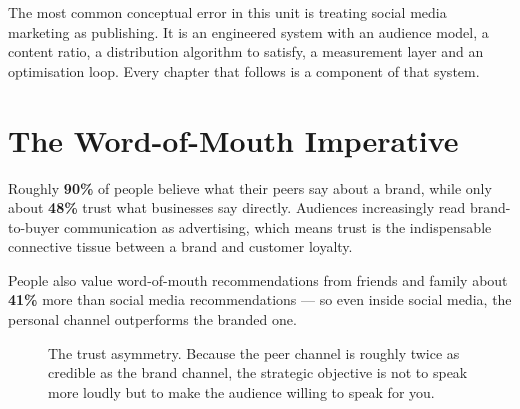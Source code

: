 \documentclass{MMTextbook}
\begin{document}
\begin{warnbox}
The most common conceptual error in this unit is treating social media marketing
as publishing. It is an engineered system with an audience model, a content
ratio, a distribution algorithm to satisfy, a measurement layer and an
optimisation loop. Every chapter that follows is a component of that system.
\end{warnbox}

\section{The Word-of-Mouth Imperative}

\begin{keybox}
Roughly \textbf{90\%} of people believe what their peers say about a brand,
while only about \textbf{48\%} trust what businesses say directly. Audiences
increasingly read brand-to-buyer communication as advertising, which means trust
is the indispensable connective tissue between a brand and customer loyalty.

\smallskip
People also value word-of-mouth recommendations from friends and family about
\textbf{41\%} more than social media recommendations --- so even inside social
media, the personal channel outperforms the branded one.
\end{keybox}

\begin{figure}[htbp]
\centering
{}
\caption[The trust asymmetry]%
        {The trust asymmetry. Because the peer channel is roughly twice as
         credible as the brand channel, the strategic objective is not to speak
         more loudly but to make the audience willing to speak for you.}
\label{fig:trustasymmetry}
\end{figure}
\end{document}
